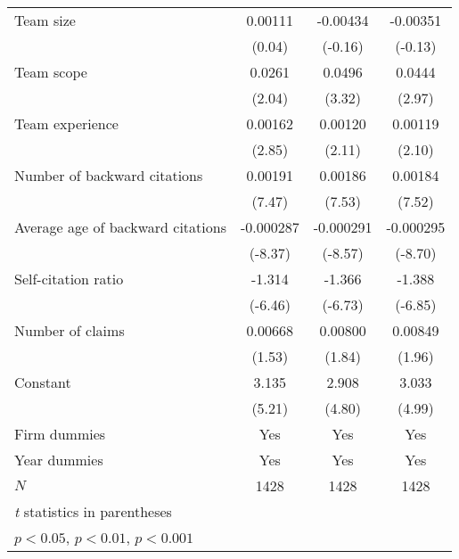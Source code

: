 {\begin{singlespace}
\begin{table}
\begin{tabular}{l*{3}{c}}
\addlinespace
Team size    &     0.00111         &    -0.00434         &    -0.00351         \\
&      (0.04)         &     (-0.16)         &     (-0.13)         \\
\addlinespace
Team scope   &      0.0261\sym{*}  &      0.0496\sym{***}&      0.0444\sym{**} \\
&      (2.04)         &      (3.32)         &      (2.97)         \\
\addlinespace
Team experience     &     0.00162\sym{**} &     0.00120\sym{*}  &     0.00119\sym{*}  \\
&      (2.85)         &      (2.11)         &      (2.10)         \\
\addlinespace
Number of backward citations      &     0.00191\sym{***}&     0.00186\sym{***}&     0.00184\sym{***}\\
&      (7.47)         &      (7.53)         &      (7.52)         \\
\addlinespace
Average age of backward citations      &   -0.000287\sym{***}&   -0.000291\sym{***}&   -0.000295\sym{***}\\
&     (-8.37)         &     (-8.57)         &     (-8.70)         \\
\addlinespace
Self-citation ratio&      -1.314\sym{***}&      -1.366\sym{***}&      -1.388\sym{***}\\
&     (-6.46)         &     (-6.73)         &     (-6.85)         \\
\addlinespace
Number of claims  &     0.00668         &     0.00800         &     0.00849         \\
&      (1.53)         &      (1.84)         &      (1.96)         \\
\addlinespace
Constant      &       3.135\sym{***}&       2.908\sym{***}&       3.033\sym{***}\\
&      (5.21)         &      (4.80)         &      (4.99)         \\
\addlinespace
Firm dummies &      Yes           &       Yes           &         Yes \\
\addlinespace
Year dummies &      Yes           &       Yes           &         Yes \\
\addlinespace
\(N\)       &        1428         &        1428         &        1428         \\
\bottomrule
\multicolumn{4}{l}{\footnotesize \textit{t} statistics in parentheses}\\
\multicolumn{4}{l}{\footnotesize \sym{*} \(p<0.05\), \sym{**} \(p<0.01\), \sym{***} \(p<0.001\)}\\
\end{tabular}
\end{table}
\end{singlespace}
}

